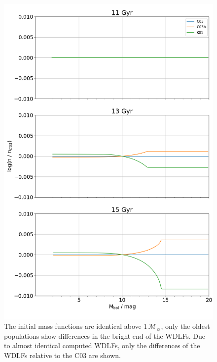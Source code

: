 \documentclass[fleqn,usenatbib]{rasti}
\newcommand{\msun}{\mathcal{M}_{\sun}}
\begin{document}
\begin{figure}
    \centering
    \includegraphics[width=\columnwidth]{fig_10_wdlf_compare_imf.png}
    \caption{The initial mass functions are identical above $1\,\msun$, only the
    oldest populations show differences in the bright end of the WDLFs. Due to
    almost identical computed WDLFs, only the differences of the WDLFs
    relative to the C03 are shown.}
    \label{fig:wdlf_compare_imf}
\end{figure}
\end{document}
